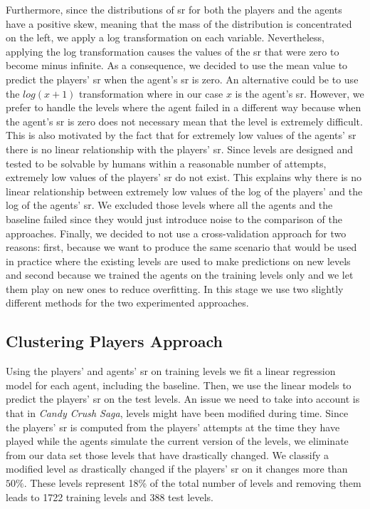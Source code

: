 Furthermore, since the distributions of \acs{sr} for both the players and the agents have a positive skew, meaning that the mass of the distribution is concentrated on the left, we apply a log transformation on each variable. Nevertheless, applying the log transformation causes the values of the \acs{sr} that were zero to become minus infinite. As a consequence, we decided to use the mean value to predict the players' \acs{sr} when the agent's \acs{sr} is zero. An alternative could be to use the $log(x + 1)$ transformation where in our case $x$ is the agent's \acs{sr}. However, we prefer to handle the levels where the agent failed in a different way because when the agent's \acs{sr} is zero does not necessary mean that the level is extremely difficult. This is also motivated by the fact that for extremely low values of the agents' \acs{sr} there is no linear relationship with the players' \acs{sr}. Since levels are designed and tested to be solvable by humans within a reasonable number of attempts, extremely low values of the players' \acs{sr} do not exist. This explains why there is no linear relationship between extremely low values of the log of the players' and the log of the agents' \acs{sr}. We excluded those levels where all the agents and the baseline failed since they would just introduce noise to the comparison of the approaches. Finally, we decided to not use a cross-validation approach for two reasons: first, because we want to produce the same scenario that would be used in practice where the existing levels are used to make predictions on new levels and second because we trained the agents on the training levels only and we let them play on new ones to reduce overfitting. 
In this stage we use two slightly different methods for the two experimented approaches. 

\subsection{Clustering Players Approach}
Using the players' and agents' \acs{sr} on training levels we fit a linear regression model for each agent, including the baseline. Then, we use the linear models to predict the players' \acs{sr} on the test levels. 
An issue we need to take into account is that in \textit{Candy Crush Saga}, levels might have been modified during time. Since the players' \acs{sr} is computed from the players' attempts at the time they have played while the agents simulate the current version of the levels, we eliminate from our data set those levels that have drastically changed. We classify a modified level as drastically changed if the players' \acs{sr} on it changes more than $50\%$. These levels represent 18\% of the total number of levels and removing them leads to 1722 training levels and 388 test levels. 

